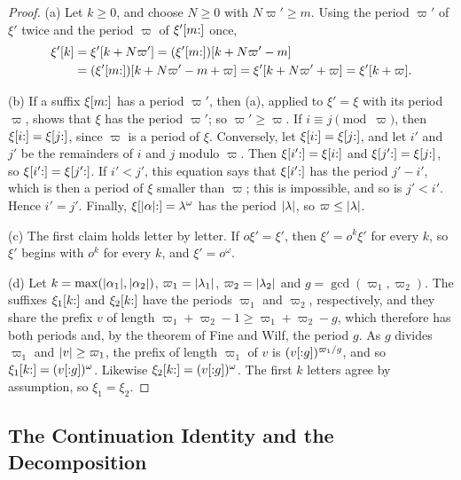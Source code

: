\begin{proof}
(a) Let $k\ge0$, and choose $N\ge0$ with $N\varpi'\ge m$. Using the period $\varpi'$ of
$\xi'$ twice and the period $\varpi$ of $\xi'[m{:}]$ once,
\[
\begin{aligned}
 \xi'[k]&=\xi'[k+N\varpi']=(\xi'[m{:}])[k+N\varpi'-m]\\
 &=(\xi'[m{:}])[k+N\varpi'-m+\varpi]=\xi'[k+N\varpi'+\varpi]=\xi'[k+\varpi].
\end{aligned}
\]

(b) If a suffix $\xi[m{:}]$ has a period $\varpi'$, then (a), applied to $\xi'=\xi$
with its period $\varpi$, shows that $\xi$ has the period $\varpi'$; so $\varpi'\ge \varpi$. If
$i\equiv j\pmod \varpi$, then $\xi[i{:}]=\xi[j{:}]$, since $\varpi$ is a period of
$\xi$. Conversely, let $\xi[i{:}]=\xi[j{:}]$, and let $i'$ and $j'$ be the
remainders of $i$ and $j$ modulo $\varpi$. Then $\xi[i'{:}]=\xi[i{:}]$ and
$\xi[j'{:}]=\xi[j{:}]$, so $\xi[i'{:}]=\xi[j'{:}]$. If $i'<j'$, this
equation says that $\xi[i'{:}]$ has the period $j'-i'$, which is then a
period of $\xi$ smaller than $\varpi$; this is impossible, and so is $j'<i'$. Hence
$i'=j'$. Finally, $\xi[\lvert \alpha\rvert{:}]=\lambda^\omega$ has the period
$\lvert \lambda\rvert$, so $\varpi\le\lvert \lambda\rvert$.

(c) The first claim holds letter by letter. If $o\xi'=\xi'$, then $\xi'=o^k\xi'$ for every
$k$, so $\xi'$ begins with $o^k$ for every $k$, and $\xi'=o^\omega$.

(d) Let $k=\max(\lvert \alpha_1\rvert,\lvert \alpha_2\rvert)$, $\varpi_1=\lvert \lambda_1\rvert$,
$\varpi_2=\lvert \lambda_2\rvert$ and $g=\gcd(\varpi_1,\varpi_2)$. The suffixes $\xi_1[k{:}]$ and
$\xi_2[k{:}]$ have the periods $\varpi_1$ and $\varpi_2$, respectively, and they share
the prefix $v$ of length $\varpi_1+\varpi_2-1\ge \varpi_1+\varpi_2-g$, which therefore has both
periods and, by the theorem of Fine and Wilf, the period $g$. As $g$ divides
$\varpi_1$ and $\lvert v\rvert\ge \varpi_1$, the prefix of length $\varpi_1$ of $v$ is
$(v[{:}g])^{\varpi_1/g}$, and so $\xi_1[k{:}]=(v[{:}g])^\omega$. Likewise
$\xi_2[k{:}]=(v[{:}g])^\omega$. The first $k$ letters agree by assumption,
so $\xi_1=\xi_2$.
\end{proof}

\subsection{The Continuation Identity and the Decomposition}\label{app:nm-continuation}

